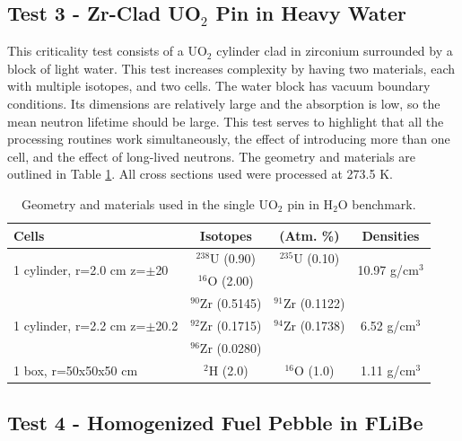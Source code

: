 \documentclass[preprint,12pt]{elsarticle}
\begin{document}
\subsection{Test 3 - Zr-Clad UO$_2$ Pin in Heavy Water}

This criticality test consists of a UO$_2$ cylinder clad in zirconium surrounded by a block of light water.  This test increases complexity by having two materials, each with multiple isotopes, and two cells.  The water block has vacuum boundary conditions.  Its dimensions are relatively large and the absorption is low, so the mean neutron lifetime should be large.  This test serves to highlight that all the processing routines work simultaneously, the effect of introducing more than one cell, and the effect of long-lived neutrons.  The geometry and materials are outlined in Table \ref{uo2_pincell_geom}.  All cross sections used were processed at 273.5 K.

\begin{table}[h]
\centering
\caption{Geometry and materials used in the single UO$_2$ pin in H$_2$O benchmark.}
\label{uo2_pincell_geom}
\begin{tabular}{| l | c  c | c |}
\hline
Cells & Isotopes & (Atm. \%)& Densities \\
\hline
\multirow{2}{*}{1 cylinder, r=2.0 cm z=$\pm$20 }  &   $^{238}$U   (0.90) &  $^{235}$U   (0.10) &  \multirow{2}{*}{10.97 g/cm$^3$} \\
                                                                              &   $^{16}$O    (2.00)  &                              &  \\
\hline
\multirow{3}{*}{1 cylinder, r=2.2 cm z=$\pm$20.2}  &   $^{90}$Zr   (0.5145) &  $^{91}$Zr   (0.1122)&  \multirow{3}{*}{6.52 g/cm$^3$} \\
                                                   &   $^{92}$Zr   (0.1715) &  $^{94}$Zr   (0.1738)& \\
                                                   &   $^{96}$Zr   (0.0280) &                      & \\
\hline
\multirow{1}{*}{1 box, r=50x50x50 cm }  &    $^{2}$H   (2.0) & $^{16}$O   (1.0) &   \multirow{1}{*}{1.11 g/cm$^3$} \\
\hline
\end{tabular}
\end{table}



\subsection{Test 4 - Homogenized Fuel Pebble in FLiBe}
\end{document}
